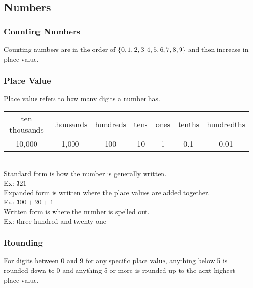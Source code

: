 \subsection{Numbers}

\subsubsection{Counting Numbers}
Counting numbers are in the order of $\{0,1,2,3,4,5,6,7,8,9\}$ and then increase in place value.

\subsubsection{Place Value}
Place value refers to how many digits a number has.\\
\vspace{0.2cm}
\begin{tabular}{|c|c|c|c|c|c|c|}
    ten thousands & thousands & hundreds & tens & ones & tenths & hundredths\\
    10,000 & 1,000 & 100 & 10 & 1 & 0.1 & 0.01
\end{tabular}\\
Standard form is how the number is generally written.\\
Ex: $321$\\
Expanded form is written where the place values are added together.\\
Ex: $300+20+1$\\
Written form is where the number is spelled out.\\
Ex: three-hundred-and-twenty-one

\subsubsection{Rounding}
For digits between 0 and 9 for any specific place value, anything below 5 is rounded down to 0 and anything 5 or more is rounded up to the next highest place value.